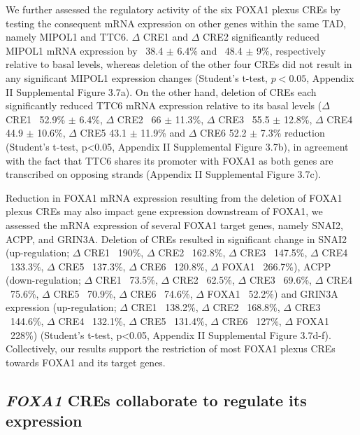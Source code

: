 We further assessed the regulatory activity of the six FOXA1 plexus CREs by testing the consequent mRNA expression on other genes within the same TAD, namely MIPOL1 and TTC6.
$\Delta$ CRE1 and $\Delta$ CRE2 significantly reduced MIPOL1 mRNA expression by ~38.4 $\pm$ 6.4\% and ~48.4 $\pm$ 9\%, respectively relative to basal levels, whereas deletion of the other four CREs did not result in any significant MIPOL1 expression changes (Student’s t-test, $p<0.05$, Appendix II Supplemental Figure 3.7a).
On the other hand, deletion of CREs each significantly reduced TTC6 mRNA expression relative to its basal levels ($\Delta$ CRE1 ~52.9\% $\pm$ 6.4\%, $\Delta$ CRE2 ~66 $\pm$ 11.3\%, $\Delta$ CRE3 ~55.5 $\pm$ 12.8\%, $\Delta$ CRE4 44.9 $\pm$ 10.6\%, $\Delta$ CRE5 43.1 $\pm$ 11.9\% and $\Delta$ CRE6 52.2 $\pm$ 7.3\% reduction (Student’s t-test, p<0.05, Appendix II Supplemental Figure 3.7b), in agreement with the fact that TTC6 shares its promoter with FOXA1 as both genes are transcribed on opposing strands (Appendix II Supplemental Figure 3.7c).

Reduction in FOXA1 mRNA expression resulting from the deletion of FOXA1 plexus CREs may also impact gene expression downstream of FOXA1, we assessed the mRNA expression of several FOXA1 target genes, namely SNAI2, ACPP, and GRIN3A.
Deletion of CREs resulted in significant change in SNAI2 (up-regulation; $\Delta$ CRE1 ~190\%, $\Delta$ CRE2 ~162.8\%, $\Delta$ CRE3 ~147.5\%, $\Delta$ CRE4 ~133.3\%, $\Delta$ CRE5 ~137.3\%, $\Delta$ CRE6 ~120.8\%, $\Delta$ FOXA1 ~266.7\%), ACPP (down-regulation; $\Delta$ CRE1 ~73.5\%, $\Delta$ CRE2 ~62.5\%, $\Delta$ CRE3 ~69.6\%, $\Delta$ CRE4 ~75.6\%, $\Delta$ CRE5 ~70.9\%, $\Delta$ CRE6 ~74.6\%, $\Delta$ FOXA1 ~52.2\%) and GRIN3A expression (up-regulation; $\Delta$ CRE1 ~138.2\%, $\Delta$ CRE2 ~168.8\%, $\Delta$ CRE3 ~144.6\%, $\Delta$ CRE4 ~132.1\%, $\Delta$ CRE5 ~131.4\%, $\Delta$ CRE6 ~127\%, $\Delta$ FOXA1 ~228\%) (Student’s t-test, p<0.05, Appendix II Supplemental Figure 3.7d-f).
Collectively, our results support the restriction of most FOXA1 plexus CREs towards FOXA1 and its target genes.

\subsection{\emph{FOXA1} CREs collaborate to regulate its expression}

